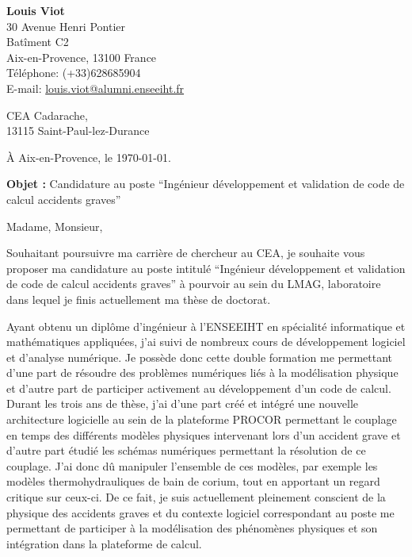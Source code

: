 \documentclass[11pt]{article}
\begin{document}
\begin{flushleft}
	\textbf{Louis Viot}\\
	30 Avenue Henri Pontier \\
	Batîment C2 \\
	Aix-en-Provence, 13100 France\\
	Téléphone: (+33)628685904 \\
	E-mail: \href{mailto:louis.viot@alumni.enseeiht.fr}{louis.viot@alumni.enseeiht.fr} \\
\end{flushleft}
\begin{flushright}
	CEA Cadarache,\\
	13115 Saint-Paul-lez-Durance\\
\end{flushright}
\begin{flushright}
À Aix-en-Provence, le \today{}.
\end{flushright}
\textbf{Objet :} Candidature au poste ``Ingénieur développement et validation de code de calcul accidents graves''

Madame, Monsieur,

Souhaitant poursuivre ma carrière de chercheur au CEA, je souhaite vous proposer ma candidature au poste intitulé ``Ingénieur développement et validation de code de calcul accidents graves'' à pourvoir au sein du LMAG, laboratoire dans lequel je finis actuellement ma thèse de doctorat.

Ayant obtenu un diplôme d'ingénieur à l'ENSEEIHT en spécialité informatique et mathématiques appliquées, j'ai suivi de nombreux cours de développement logiciel et d'analyse numérique. Je possède donc cette double formation me permettant d'une part de résoudre des problèmes numériques liés à la modélisation physique et d'autre part de participer activement au développement d'un code de calcul. Durant les trois ans de thèse, j'ai d'une part créé et intégré une nouvelle architecture logicielle au sein de la plateforme PROCOR permettant le couplage en temps des différents modèles physiques intervenant lors d'un accident grave et d'autre part étudié les schémas numériques permettant la résolution de ce couplage. J'ai donc dû manipuler l'ensemble de ces modèles, par exemple les modèles thermohydrauliques de bain de corium, tout en apportant un regard critique sur ceux-ci. De ce fait, je suis actuellement pleinement conscient de la physique des accidents graves et du contexte logiciel correspondant au poste me permettant de participer à la modélisation des phénomènes physiques et son intégration dans la plateforme de calcul.
\end{document}
